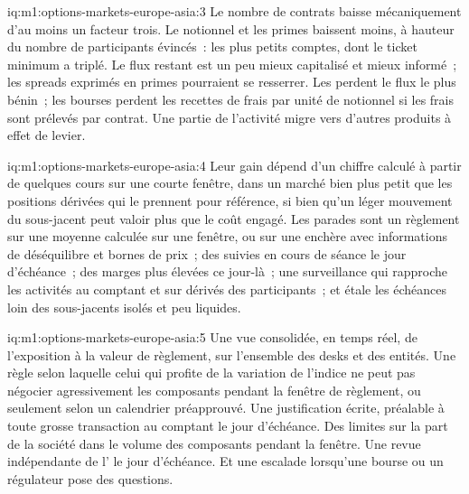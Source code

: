 \begin{solution}{iq:m1:options-markets-europe-asia:3}
Le nombre de contrats baisse mécaniquement d'au moins un facteur trois. Le notionnel et
les primes baissent moins, à hauteur du nombre de participants évincés~: les plus petits
comptes, dont le ticket minimum a triplé. Le flux restant est un peu
mieux capitalisé et mieux informé~; les spreads exprimés en primes pourraient
se resserrer. Les  perdent le flux le plus bénin~; les bourses perdent les recettes de frais
par unité de notionnel si les frais sont prélevés par contrat. Une partie de l'activité
migre vers d'autres produits à effet de levier.
\end{solution}

\begin{solution}{iq:m1:options-markets-europe-asia:4}
Leur gain dépend d'un chiffre calculé à partir de quelques cours sur une courte
fenêtre, dans un marché bien plus petit que les positions dérivées qui le prennent pour
référence, si bien qu'un léger mouvement du sous-jacent peut valoir plus que le
coût engagé. Les parades sont un règlement sur une moyenne calculée sur une fenêtre, ou sur une enchère
avec informations de déséquilibre et bornes de prix~; des  suivies
en cours de séance le jour d'échéance~; des marges plus élevées ce jour-là~; une surveillance qui
rapproche les activités au comptant et sur dérivés des participants~; et étale les échéances
loin des sous-jacents isolés et peu liquides.
\end{solution}

\begin{solution}{iq:m1:options-markets-europe-asia:5}
Une vue consolidée, en temps réel, de l'exposition à la valeur de règlement, sur
l'ensemble des desks et des entités. Une règle selon laquelle celui qui profite de la variation
de l'indice ne peut pas négocier agressivement les composants pendant la fenêtre de règlement,
ou seulement selon un calendrier préapprouvé. Une justification écrite, préalable à toute grosse
transaction au comptant le jour d'échéance. Des limites sur la part de la société dans le volume des
composants pendant la fenêtre. Une revue indépendante de l'
le jour d'échéance. Et une escalade lorsqu'une bourse ou un régulateur pose des questions.
\end{solution}

